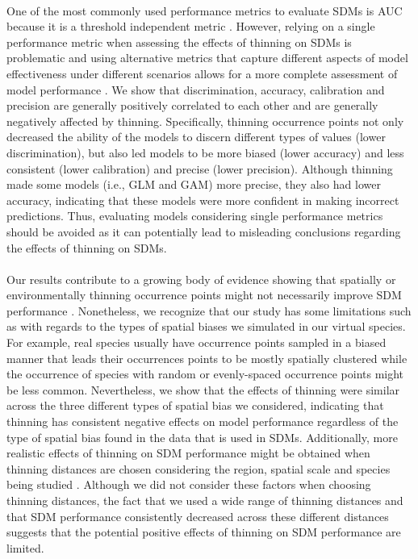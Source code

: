 \paragraph*{}
One of the most commonly used performance metrics to evaluate SDMs is AUC because it is a threshold independent metric \parencite{fourcade2018}. However, relying on a single performance metric when assessing the effects of thinning on SDMs is problematic \parencite{castellanos2019} and using alternative metrics that capture different aspects of model effectiveness under different scenarios allows for a more complete assessment of model performance \parencite{norberg2019, lotterhos2022}. We show that discrimination, accuracy, calibration and precision are generally positively correlated to each other and are generally negatively affected by thinning. Specifically, thinning occurrence points not only decreased the ability of the models to discern different types of values (lower discrimination), but also led models to be more biased (lower accuracy) and less consistent (lower calibration) and precise (lower precision). Although thinning made some models (i.e., GLM and GAM) more precise, they also had lower accuracy, indicating that these models were more confident in making incorrect predictions. Thus, evaluating models considering single performance metrics should be avoided as it can potentially lead to misleading conclusions regarding the effects of thinning on SDMs.



\paragraph*{}
Our results contribute to a growing body of evidence showing that spatially or environmentally thinning occurrence points might not necessarily improve SDM performance \parencite{castellanos2019, steen2021, inman2021}. Nonetheless, we recognize that our study has some limitations such as with regards to the types of spatial biases we simulated in our virtual species. For example, real species usually have occurrence points sampled in a biased manner \parencite{vale2012,sousa2014,oliveira2016} that leads their occurrences points to be mostly spatially clustered \parencite{beck2014, inman2021} while the occurrence of species with random or evenly-spaced occurrence points might be less common. Nevertheless, we show that the effects of thinning were similar across the three different types of spatial bias we considered, indicating that thinning has consistent negative effects on model performance regardless of the type of spatial bias found in the data that is used in SDMs. Additionally, more realistic effects of thinning on SDM performance might be obtained when thinning distances are chosen considering the region, spatial scale and species being studied \parencite{castellanos2019}. Although we did not consider these factors when choosing thinning distances, the fact that we used a wide range of thinning distances and that SDM performance consistently decreased across these different distances suggests that the potential positive effects of thinning on SDM performance are limited.



